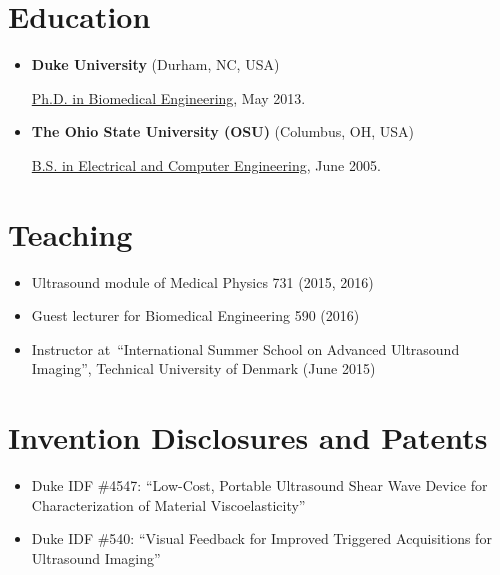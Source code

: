 \documentclass[letterpaper,10pt,english]{sphinxmanual}
\begin{document}
\section{Education}
\label{resume:education}\begin{itemize}
\item {} 
\textbf{Duke University} (Durham, NC, USA)

\href{http://bme.duke.edu/grad}{Ph.D. in Biomedical Engineering}, May
2013.

\item {} 
\textbf{The Ohio State University (OSU)} (Columbus, OH, USA)

\href{http://ece.osu.edu/futurestudents/undergrad}{B.S. in Electrical and Computer
Engineering}, June
2005.

\end{itemize}


\section{Teaching}
\label{resume:teaching}\begin{itemize}
\item {} 
Ultrasound module of Medical Physics 731 (2015, 2016)

\item {} 
Guest lecturer for Biomedical Engineering 590 (2016)

\item {} 
Instructor at ``International Summer School on Advanced Ultrasound
Imaging'', Technical University of Denmark (June 2015)

\end{itemize}


\section{Invention Disclosures and Patents}
\label{resume:invention-disclosures-and-patents}\begin{itemize}
\item {} 
Duke IDF \#4547: ``Low-Cost, Portable Ultrasound Shear Wave Device for
Characterization of Material Viscoelasticity''

\item {} 
Duke IDF \#540: ``Visual Feedback for Improved Triggered Acquisitions
for Ultrasound Imaging''

\end{itemize}
\end{document}
